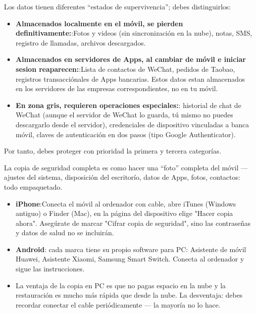 


Los datos tienen diferentes “estados de supervivencia”; debes distinguirlos:

\begin{itemize}
  \item \textbf{Almacenados localmente en el móvil, se pierden definitivamente:}:Fotos y videos (sin sincronización en la nube), notas, SMS, registro de llamadas, archivos descargados.
  \item \textbf{Almacenados en servidores de Apps, al cambiar de móvil e iniciar sesion reaparecen:}:Lista de contactos de WeChat, pedidos de Taobao, registros transacciónales de Apps bancarias. Estos datos estan almacenados en los servidores de las empresas correspondientes, no en tu móvil.
  \item \textbf{En zona gris, requieren operaciones especiales:}: historial de chat de WeChat (aunque el servidor de WeChat lo guarda, tú mismo no puedes descargarlo desde el servidor), credenciales de dispositivo vinculadas a banca móvil, claves de autenticación en dos pasos (tipo Google Authenticator).
\end{itemize}

Por tanto, debes proteger con prioridad la primera y tercera categorías.


La copia de seguridad completa es como hacer una “foto” completa del móvil —ajustes del sistema, disposición del escritorío, datos de Apps, fotos, contactos: todo empaquetado.


\begin{itemize}
  \item \textbf{iPhone}:Conecta el móvil al ordenador con cable, abre iTunes (Windows antiguo) o Finder (Mac), en la página del dispositivo elige "Hacer copia ahora". Asegúrate de marcar "Cifrar copia de seguridad", sino las contraseñas y datos de salud no se incluirán.
  \item \textbf{Android}: cada marca tiene su propio software para PC: Asistente de móvil Huawei, Asistente Xiaomi, Samsung Smart Switch. Conecta al ordenador y sigue las instrucciones.
  \item La ventaja de la copia en PC es que no pagas espacio en la nube y la restauración es mucho más rápida que desde la nube. La desventaja: debes recordar conectar el cable periódicamente — la mayoría no lo hace.
\end{itemize}

